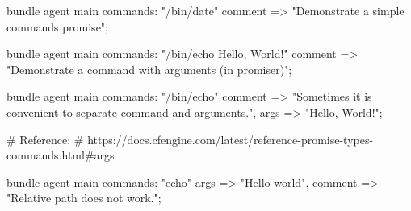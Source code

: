 \begin{codelisting}
\begin{code}
bundle agent main
{
  commands:
      "/bin/date"
        comment => "Demonstrate a simple commands promise";
}
\end{code}
\end{codelisting}
\begin{codelisting}
\begin{code}
bundle agent main
{
  commands:
      "/bin/echo Hello, World!"
        comment => "Demonstrate a command with arguments (in promiser)";
}
\end{code}
\end{codelisting}
\begin{codelisting}
\begin{code}
bundle agent main
{
  commands:
      "/bin/echo"
        comment => "Sometimes it is convenient to separate command
                    and arguments.",
        args => "Hello, World!";
}

# Reference:
# https://docs.cfengine.com/latest/reference-promise-types-commands.html#args
\end{code}
\end{codelisting}
\begin{codelisting}
\begin{code}
bundle agent main
{
  commands:
      "echo"
        args => "Hello world",
        comment => "Relative path does not work.";
}

\end{code}
\end{codelisting}
\begin{codelisting}
\end{codelisting}
